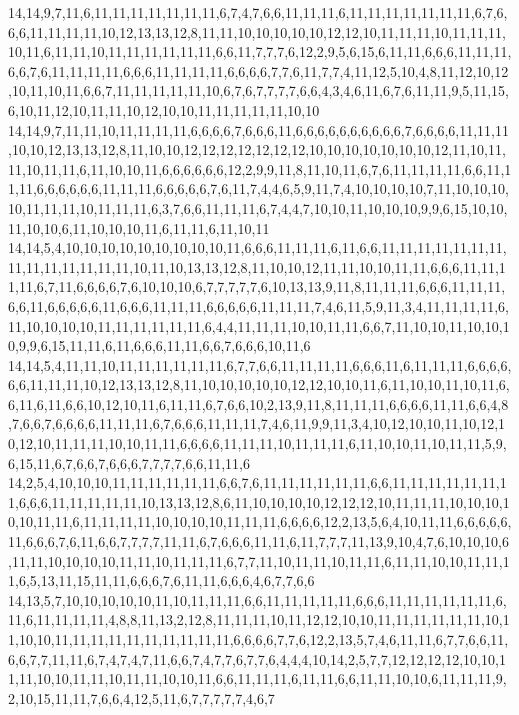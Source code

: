14,14,9,7,11,6,11,11,11,11,11,11,11,6,7,4,7,6,6,11,11,11,6,11,11,11,11,11,11,11,6,7,6,6,6,11,11,11,11,10,12,13,13,12,8,11,11,10,10,10,10,10,12,12,10,11,11,11,10,11,11,11,10,11,6,11,11,10,11,11,11,11,11,11,6,6,11,7,7,7,6,12,2,9,5,6,15,6,11,11,6,6,6,11,11,11,6,6,7,6,11,11,11,11,6,6,6,11,11,11,11,6,6,6,6,7,7,6,11,7,7,4,11,12,5,10,4,8,11,12,10,12,10,11,10,11,6,6,7,11,11,11,11,11,10,6,7,6,7,7,7,7,6,6,4,3,4,6,11,6,7,6,11,11,9,5,11,15,6,10,11,12,10,11,11,10,12,10,10,11,11,11,11,11,10,10
14,14,9,7,11,11,10,11,11,11,11,6,6,6,6,7,6,6,6,11,6,6,6,6,6,6,6,6,6,6,7,6,6,6,6,11,11,11,10,10,12,13,13,12,8,11,10,10,12,12,12,12,12,12,12,10,10,10,10,10,10,10,12,11,10,11,11,10,11,11,6,11,10,10,11,6,6,6,6,6,6,12,2,9,9,11,8,11,10,11,6,7,6,11,11,11,11,6,6,11,11,11,6,6,6,6,6,6,11,11,11,6,6,6,6,6,7,6,11,7,4,4,6,5,9,11,7,4,10,10,10,10,7,11,10,10,10,10,11,11,11,10,11,11,11,6,3,7,6,6,11,11,11,6,7,4,4,7,10,10,11,10,10,10,9,9,6,15,10,10,11,10,10,6,11,10,10,10,11,6,11,11,6,11,10,11
14,14,5,4,10,10,10,10,10,10,10,10,10,11,6,6,6,11,11,11,6,11,6,6,11,11,11,11,11,11,11,11,11,11,11,11,11,11,10,11,10,13,13,12,8,11,10,10,12,11,11,10,10,11,11,6,6,6,11,11,11,11,6,7,11,6,6,6,6,7,6,10,10,10,6,7,7,7,7,7,6,10,13,13,9,11,8,11,11,11,6,6,6,11,11,11,6,6,11,6,6,6,6,6,11,6,6,6,11,11,11,6,6,6,6,6,11,11,11,7,4,6,11,5,9,11,3,4,11,11,11,11,6,11,10,10,10,10,11,11,11,11,11,11,6,4,4,11,11,11,10,10,11,11,6,6,7,11,10,10,11,10,10,10,9,9,6,15,11,11,6,11,6,6,6,11,11,6,6,7,6,6,6,10,11,6
14,14,5,4,11,11,10,11,11,11,11,11,11,6,7,7,6,6,11,11,11,11,6,6,6,11,6,11,11,11,6,6,6,6,6,6,11,11,11,10,12,13,13,12,8,11,10,10,10,10,10,12,12,10,10,11,6,11,10,10,11,10,11,6,6,11,6,11,6,6,10,12,10,11,6,11,11,6,7,6,6,10,2,13,9,11,8,11,11,11,6,6,6,6,11,11,6,6,4,8,7,6,6,7,6,6,6,6,11,11,11,6,7,6,6,6,11,11,11,7,4,6,11,9,9,11,3,4,10,12,10,10,11,10,12,10,12,10,11,11,11,10,10,11,11,6,6,6,6,11,11,11,10,11,11,11,6,11,10,10,11,10,11,11,5,9,6,15,11,6,7,6,6,7,6,6,6,7,7,7,7,6,6,11,11,6
14,2,5,4,10,10,10,11,11,11,11,11,11,6,6,7,6,11,11,11,11,11,11,6,6,11,11,11,11,11,11,11,6,6,6,11,11,11,11,11,10,13,13,12,8,6,11,10,10,10,10,12,12,12,10,11,11,11,10,10,10,10,10,11,11,6,11,11,11,11,10,10,10,10,11,11,11,6,6,6,6,12,2,13,5,6,4,10,11,11,6,6,6,6,6,11,6,6,6,7,6,11,6,6,7,7,7,7,11,11,6,7,6,6,6,11,11,6,11,7,7,7,11,13,9,10,4,7,6,10,10,10,6,11,11,10,10,10,10,11,11,10,11,11,11,6,7,7,11,10,11,11,10,11,11,6,11,11,10,10,11,11,11,6,5,13,11,15,11,11,6,6,6,7,6,11,11,6,6,6,4,6,7,7,6,6
14,13,5,7,10,10,10,10,10,11,10,11,11,11,6,6,11,11,11,11,11,6,6,6,11,11,11,11,11,11,6,11,6,11,11,11,11,4,8,8,11,13,2,12,8,11,11,11,10,11,12,12,10,10,11,11,11,11,11,11,10,11,10,10,11,11,11,11,11,11,11,11,11,11,6,6,6,6,7,7,6,12,2,13,5,7,4,6,11,11,6,7,7,6,6,11,6,6,7,7,11,11,6,7,4,7,4,7,11,6,6,7,4,7,7,6,7,7,6,4,4,4,10,14,2,5,7,7,12,12,12,12,10,10,11,11,10,10,11,11,10,11,11,10,10,11,6,6,11,11,11,6,11,11,6,6,11,11,10,10,6,11,11,11,9,2,10,15,11,11,7,6,6,4,12,5,11,6,7,7,7,7,7,4,6,7
